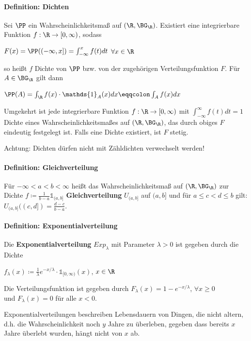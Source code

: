 \paragraph{Definition: Dichten}
Sei $\PP$ ein Wahrscheinlichkeitsmaß auf $(\R,\BG_{\R})$. Existiert eine integrierbare Funktion $f:\R\rightarrow[0,\infty)$, sodass
\begin{tightcenter}
	$F(x)=\PP((-\infty,x])=\int_{-\infty}^{x}f(t)dt$ \qquad$\forall x\in\R$
\end{tightcenter}
so heißt $f$ Dichte von $\PP$ bzw. von der zugehörigen Verteilungsfunktion $F$.
Für $A\in\BG_{\R}$ gilt dann
\begin{tightcenter}
	$\PP(A)=\int_{\R}f(x)\cdot\mathds{1}_A(x)dx\eqqcolon\int_{A}f(x)dx$
\end{tightcenter}
Umgekehrt ist jede integrierbare Funktion $f:\R\rightarrow[0,\infty)$ mit $\int_{-\infty}^{\infty}f(t)dt=1$ Dichte eines Wahrscheinlichkeitsmaßes auf  $(\R,\BG_{\R})$, das durch obiges $F$ eindeutig festgelegt ist.
Falls eine Dichte existiert, ist $F$ stetig.

Achtung: Dichten dürfen nicht mit Zähldichten verwechselt werden!

\paragraph{Definition: Gleichverteilung}
Für $-\infty<a<b<\infty$ heißt das Wahrscheinlichkeitsmaß auf $(\R,\BG_{\R})$ zur Dichte $f\coloneqq\frac{1}{b-a}\mathds{1}_{(a,b]}$ \textbf{Gleichverteilung} $U_{(a,b]}$ auf $(a,b]$ und für $a\leq c<d\leq b$ gilt:\\ $U_{(a,b]}((c,d])=\frac{d-c}{b-a}$.

\paragraph{Definition: Exponentialverteilung}
Die \textbf{Exponentialverteilung} $Exp_\lambda$ mit Parameter $\lambda>0$ ist gegeben durch die Dichte
\begin{tightcenter}
	$f_\lambda(x)\coloneqq\frac{1}{\lambda}e^{-x/\lambda}\cdot\mathds{1}_{[0,\infty)}(x)$, \qquad$x\in\R$
\end{tightcenter}
Die Verteilungsfunktion ist gegeben durch $F_\lambda(x)=1-e^{-x/\lambda}$, \qquad$\forall x\geq 0$\\ und $F_\lambda(x)=0$ für alle $x<0$.

Exponentialverteilungen beschreiben Lebensdauern von Dingen, die nicht altern, d.h. die Wahrscheinlichkeit noch $y$ Jahre zu überleben, gegeben dass bereits $x$ Jahre überlebt wurden, hängt nicht von $x$ ab.

